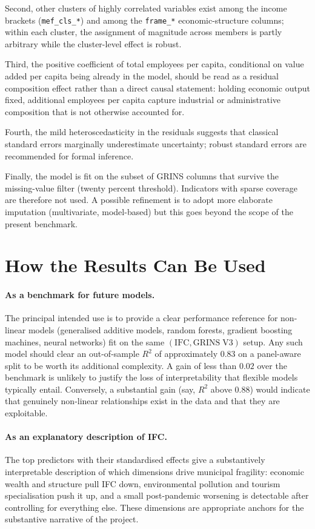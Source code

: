 \documentclass[11pt,a4paper]{article}
\begin{document}
Second, other clusters of highly correlated variables exist among the
income brackets (\texttt{mef\_cls\_*}) and among the \texttt{frame\_*}
economic-structure columns; within each cluster, the assignment of
magnitude across members is partly arbitrary while the cluster-level
effect is robust.

Third, the positive coefficient of total employees per capita,
conditional on value added per capita being already in the model,
should be read as a residual composition effect rather than a direct
causal statement: holding economic output fixed, additional employees
per capita capture industrial or administrative composition that is
not otherwise accounted for.

Fourth, the mild heteroscedasticity in the residuals suggests that
classical standard errors marginally underestimate uncertainty;
robust standard errors are recommended for formal inference.

Finally, the model is fit on the subset of GRINS columns that survive
the missing-value filter (twenty percent threshold). Indicators with
sparse coverage are therefore not used. A possible refinement is to
adopt more elaborate imputation (multivariate, model-based) but this
goes beyond the scope of the present benchmark.

\section{How the Results Can Be Used}
\label{sec:use}

\paragraph{As a benchmark for future models.}
The principal intended use is to provide a clear performance reference
for non-linear models (generalised additive models, random forests,
gradient boosting machines, neural networks) fit on the same
\((\mathrm{IFC}, \mathrm{GRINS\;V3})\) setup. Any such model should
clear an out-of-sample \(R^{2}\) of approximately \(0.83\) on a
panel-aware split to be worth its additional complexity. A gain of
less than \(0.02\) over the benchmark is unlikely to justify the loss
of interpretability that flexible models typically entail. Conversely,
a substantial gain (say, \(R^{2}\) above \(0.88\)) would indicate that
genuinely non-linear relationships exist in the data and that they
are exploitable.

\paragraph{As an explanatory description of IFC.}
The top predictors with their standardised effects give a substantively
interpretable description of which dimensions drive municipal
fragility: economic wealth and structure pull IFC down, environmental
pollution and tourism specialisation push it up, and a small
post-pandemic worsening is detectable after controlling for everything
else. These dimensions are appropriate anchors for the substantive
narrative of the project.
\end{document}
